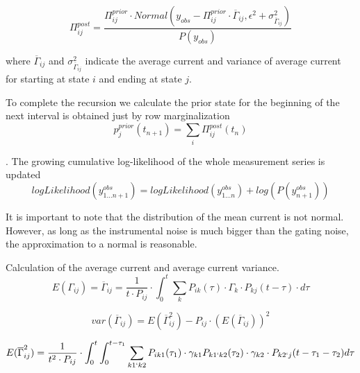 \documentclass[pdflatex,sn-mathphys-num]{sn-jnl}%
\theoremstyle{thmstyleone}%
\theoremstyle{thmstyletwo}%
\theoremstyle{thmstylethree}%
\begin{document}
\begin{equation}
\Pi^{post}_{ij} = \frac {\Pi^{prior}_{ij} \cdot Normal \left (y_{obs}-{\Pi^{prior}_{ij} \cdot {\overline \Gamma}_{ij}} , \epsilon^2 + \sigma^2_{\overline{\Gamma}_{ij}} \right)}{P(y_{obs})}
\end{equation}




where $ {\overline \Gamma}_{ij}$  and $\sigma^2_{\overline{\Gamma}_{ij}}$ indicate the average current and variance of average current for starting at state $i$ and ending at state $j$. 

To complete the recursion we calculate the prior state for the beginning of the next interval is obtained just by row marginalization
\begin{equation}
p^{prior}_{j}(t_{n+1}) =\sum_i \Pi^{post}_{ij}(t_n)  
\end{equation}


. 
The growing cumulative log-likelihood of the whole measurement series is updated
\begin{equation}
logLikelihood \left(y^{obs}_{1 \dots n+1} \right) = logLikelihood (y^{obs}_{ 1 \dots n}) +log(P(y^{obs}_{n+1}))
\end{equation}


It is important to note that the distribution of the mean current is not normal. However, as long as the instrumental noise is much bigger than the gating noise, the approximation to a normal is reasonable. 

Calculation of the average current and average current variance. 
\begin{equation}
E(\Gamma_{ij}) = { \overline  \Gamma}_{ij} = {\frac {1} {t \cdot P_{ij}} } \cdot  \int_0^t \sum_k P_{ik}(\tau) \cdot \Gamma_k \cdot P_{kj}(t-\tau)\cdot d\tau 
\end{equation}

\begin{equation}
var({\overline  \Gamma}_{ij}) = E({\overline  \Gamma}_{ij}^2)- P_{ij} \cdot (E({\overline  \Gamma}_{ij}))^2
\end{equation}




\begin{equation}
E({\overline \Gamma}_{ij}^2) = {\frac {1} {t^2 \cdot P_{ij}} } \cdot  \int_0^t   \int_0^{t-\tau_1}   \sum_{k1`k2}P_{ik1}(\tau_1) \cdot \gamma_{k1} P_{k1`k2}(\tau_2) \cdot \gamma_{k2} \cdot P_{k2`j}(t-\tau_1-\tau_2)d\tau 
\end{equation}
\end{document}
